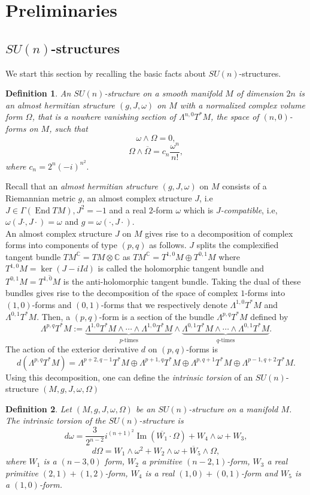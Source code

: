 \documentclass[12pt, reqno]{amsart}
\newtheorem{Def}{Definition}[subsection]
\theoremstyle{definition}
\DeclareMathOperator\Ima{Im}
\DeclareMathOperator\End{End}
\newcommand{\C}{\mathbb{C}}
\begin{document}
\section{Preliminaries}\label{2}
\subsection{$SU(n)$-structures}\label{2.1}
We start this section by recalling the basic facts about $SU(n)$-structures. 
\begin{Def}
    An $SU(n)$-structure on a smooth manifold $M$ of dimension $2n$ is an almost hermitian structure $(g,J,\omega)$ on $M$ with a normalized complex volume form $\Omega$, that is a nowhere vanishing section of $\Lambda^{n,0}T^*M$, the space of $(n,0)$-forms on $M$, such that 
    $$\omega\wedge\Omega=0,$$ $$\Omega\wedge\overline\Omega=c_n\frac{\omega^n}{n!},$$ where $c_n=2^n(-i)^{n^2}.$
\end{Def}
Recall that an \textit{almost hermitian structure} $(g,J,\omega)$ on $M$ consists of a Riemannian metric $g$, an almost complex structure $J$, i.e $J\in\Gamma(\End TM), J^2=-1$ and a real $2$-form $\omega$ which is \textit{$J$-compatible}, i.e,  $\omega(J\cdot,J\cdot)=\omega$ and $g=\omega(\cdot,J\cdot).$ \\
\indent An almost complex structure $J$ on $M$ gives rise to a decomposition of complex forms into components of type $(p,q)$ as follows. $J$ splits the complexified tangent bundle $TM^\C=TM\otimes\C$ as $TM^\C=T^{1,0}M\oplus T^{0,1}M$ where $T^{1,0}M=\ker(J-iId)$ is called the holomorphic tangent bundle and $T^{0,1}M=\overline{T^{1,0}M}$ is the anti-holomorphic tangent bundle. Taking the dual of these bundles gives rise to the decomposition of the space of complex $1$-forms into $(1,0)$-forms and $(0,1)$-forms that we respectively denote $\Lambda^{1,0}T^*M$ and $\Lambda^{0,1}T^*M$. Then, a $(p,q)$-form is a section of the bundle $\Lambda^{p,q}T^*M$ defined by $$\Lambda^{p,q}T^*M:=\underbrace{\Lambda^{1,0}T^*M\wedge\cdots\wedge\Lambda^{1,0}T^*M}_{\text{$p$-times}}\wedge\underbrace{\Lambda^{0,1}T^*M\wedge\cdots\wedge\Lambda^{0,1}T^*M}_{\text{$q$-times}}.$$
\indent The action of the exterior derivative $d$ on $(p,q)$-forms is 
$$d(\Lambda^{p,q}T^*M)=\Lambda^{p+2,q-1}T^*M\oplus\Lambda^{p+1,q}T^*M\oplus\Lambda^{p,q+1}T^*M\oplus\Lambda^{p-1,q+2}T^*M.$$ \indent Using this decomposition, one can define the \textit{intrinsic torsion} of an $SU(n)$-structure $(M,g,J,\omega,\Omega)$ 
\begin{Def}\cite{Grayhervella,chiossi2002intrinsictorsionsu3g2}
    Let $(M,g,J,\omega,\Omega)$ be an $SU(n)$-structure on a manifold $M$. The intrinsic torsion of the $SU(n)$-structure is
    $$d\omega=\frac{3}{2^{n-2}}i^{(n+1)^2}\Ima(\overline{W_1}\cdot\Omega)+W_4\wedge\omega+W_3,$$ $$d\Omega=W_1\wedge\omega^2+W_2\wedge\omega+\overline W_5\wedge\Omega,$$ where $W_1$ is a $(n-3,0)$ form, $W_2$ a primitive $(n-2,1)$-form, $W_3$ a real primitive $(2,1)+(1,2)$-form, $W_4$ is a real $(1,0)+(0,1)$-form and $W_5$ is a   $(1,0)$-form.
\end{Def}
\end{document}
